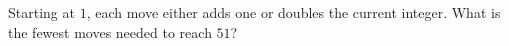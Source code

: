 Starting at $1$, each move either adds one or doubles the current integer. What is the fewest moves needed to reach $51$?
